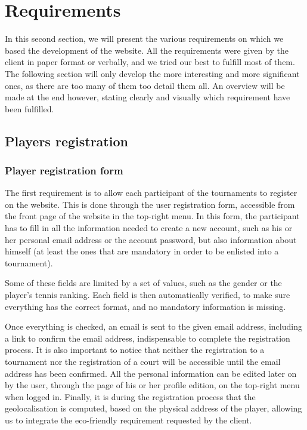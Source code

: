 \section{Requirements}
\label{sec:Requirements}

In this second section, we will present the various requirements on which we
based the development of the website. All the requirements were given by the
client in paper format or verbally, and we tried our best to fulfill most of
them. The following section will only develop the more interesting
and more significant ones, as there are too many of them too detail them all.
An overview will be made at the end however, stating clearly and visually which
requirement have been fulfilled.

\subsection{Players registration}
\label{sub:Players registration}

\subsubsection{Player registration form}
\label{subs:Registration form}

The first requirement is to allow each participant of the tournaments to
register on the website. This is done through the user registration form,
accessible from the front page of the website in the top-right menu.
In this form, the participant has to fill in all the information needed to
create a new account, such as his or her personal email address or the account
password, but also information about himself (at least the ones that
are mandatory in order to be enlisted into a tournament).\newline

Some of these fields are limited by a set of values, such as the gender or the
player's tennis ranking. Each field is then automatically verified, to make sure
everything has the correct format, and no mandatory information is missing.\newline

Once everything is checked, an email is sent to the given email address,
including a link to confirm the email address, indispensable to complete
the registration process. It is also important to notice that neither the
registration to a tournament nor the registration of a court will be accessible
until the email address has been confirmed. All the personal information can
be edited later on by the user, through the page of his or her profile edition,
on the top-right menu when logged in. Finally, it is during the registration
process that the geolocalisation is computed, based on the physical address
of the player, allowing us to integrate the eco-friendly requirement requested
by the client. \newline

